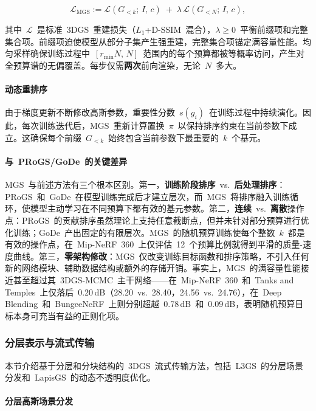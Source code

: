 \begin{equation}
\mathcal{L}_{\text{MGS}} := \mathcal{L}(G_{<k};\,I,\,c) \;+\; \lambda\,\mathcal{L}(G_{<N};\,I,\,c),
\end{equation}

其中~$\mathcal{L}$~是标准~3DGS~重建损失（$L_1$+D-SSIM~混合），$\lambda \geq 0$~平衡前缀项和完整集合项。前缀项迫使模型从部分子集产生强重建，完整集合项锚定满容量性能。均匀采样确保训练过程中~$[r_{\min}N,\,N]$~范围内的每个预算都被等概率访问，产生对全预算谱的无偏覆盖。每步仅需\textbf{两次}前向渲染，无论~$N$~多大。

\paragraph{动态重排序}

由于梯度更新不断修改高斯参数，重要性分数~$s(g_i)$~在训练过程中持续演化。因此，每次训练迭代后，MGS~重新计算置换~$\pi$~以保持排序约束在当前参数下成立。这确保每个前缀~$G_{<k}$~始终包含当前参数下最重要的~$k$~个基元。

\paragraph{与~PRoGS/GoDe~的关键差异}

MGS~与前述方法有三个根本区别。第一，\textbf{训练阶段排序}~vs.~\textbf{后处理排序}：PRoGS~和~GoDe~在模型训练完成后才建立层次，而~MGS~将排序融入训练循环，使模型主动学习在不同预算下都有效的基元参数。第二，\textbf{连续}~vs.~\textbf{离散}操作点：PRoGS~的贡献排序虽然理论上支持任意截断点，但并未针对部分预算进行优化训练；GoDe~产出固定的有限层次。MGS~的随机预算训练使每个整数~$k$~都是有效的操作点，在~Mip-NeRF~360~上仅评估~12~个预算比例就得到平滑的质量-速度曲线。第三，\textbf{零架构修改}：MGS~仅改变训练目标函数和排序策略，不引入任何新的网络模块、辅助数据结构或额外的存储开销。事实上，MGS~的满容量性能接近甚至超过其~3DGS-MCMC~主干网络——在~Mip-NeRF~360~和~Tanks and Temples~上仅落后~0.20\,dB（28.20~vs.~28.40，24.56~vs.~24.76），在~Deep Blending~和~BungeeNeRF~上则分别超越~0.78\,dB~和~0.09\,dB，表明随机预算目标本身可充当有益的正则化项。

\subsubsection{分层表示与流式传输}

本节介绍基于分层和分块结构的~3DGS~流式传输方法，包括~L3GS~的分层场景分发和~LapisGS~的动态不透明度优化。

\paragraph{分层高斯场景分发}

